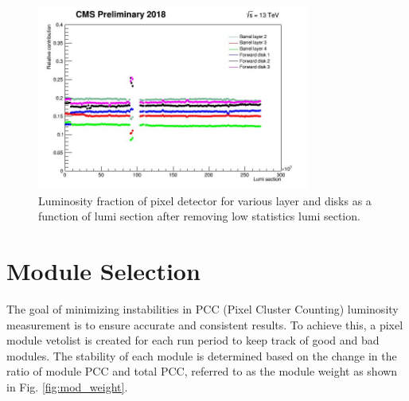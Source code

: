 



\begin{figure}[!htp]
\centering
\includegraphics[width=0.8\textwidth]{ashish_thesis/pixel_layer_disk_B0_veto.png}
\caption{%
   Luminosity fraction of pixel detector for various layer and disks as a function of lumi section after removing low statistics lumi section.
}
\label{fig:PCC_stab_L0_veto}
\end{figure}



\section{Module Selection}

The goal of minimizing instabilities in PCC (Pixel Cluster Counting) luminosity measurement is to ensure accurate and consistent results. To achieve this, a pixel module vetolist is created for each run period to keep track of good and bad modules. The stability of each module is determined based on the change in the ratio of module PCC and total PCC, referred to as the module weight as shown in Fig. \ref{fig:mod_weight}.

